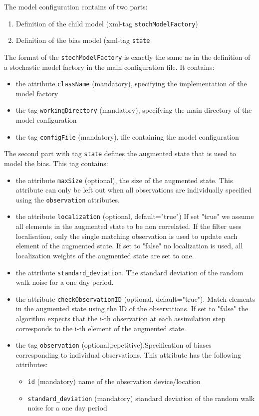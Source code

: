 The model configuration contains of two parts:
\begin{enumerate}
\item Definition of the child model (xml-tag {\tt stochModelFactory})
\item Definition of the bias model (xml-tag {\tt state}
\end{enumerate}
The format of the {\tt stochModelFactory} is exactly the same as in the definition of a stochastic model factory in the main \oda configuration file. It contains:
\begin{itemize}
\item the attribute {\tt className} (mandatory), specifying the implementation of the model factory
\item the tag {\tt workingDirectory} (mandatory), specifying the main directory of the model configuration
\item  the tag {\tt configFile} (mandatory), file containing the model configuration
\end{itemize} 
The second part with tag {\tt state} defines the augmented state that is used to model the bias. This tag contains:
\begin{itemize}
\item the attribute {\tt maxSize} (optional), the size of the augmented state. This attribute can only be left out when all observations are individually specified using the {\tt observation} attributes.
\item the attribute {\tt localization} (optional, default="true") If set "true" we assume all elements in the augmented state to be non correlated. If the filter uses localisation, only the single matching observation is used to update each element of the augmented state. If set to "false" no localization is used, all localization weights of  the augmented state are set to one.
\item the attribute {\tt standard\_deviation}. The standard deviation of the random walk noise for a one day period.
\item the attribute {\tt checkObservationID} (optional, default="true"). Match elements in the augmented state using the ID of the observations. If set to "false" the algorithm expects that the i-th observation at each assimilation step corresponds to the i-th element of the augmented state.  
\item the tag {\tt observation} (optional,repetitive).Specification of biases corresponding to individual observations. This attribute has the following attributes:
   \begin{itemize}
   \item {\tt id} (mandatory) name of the observation device/location
   \item {\tt standard\_deviation} (mandatory) standard deviation of the random walk noise for a one day
            period
   \end{itemize} 
\end{itemize}

